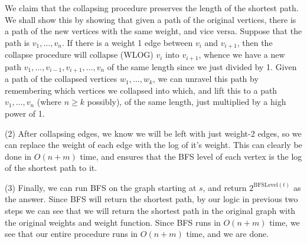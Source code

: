 \documentclass[12pt]{article}
\theoremstyle{definitionstyle}
\begin{document}
\begin{enumerate}[leftmargin=\labelsep]
        We claim that the collapsing procedure preserves the length of the shortest path. We shall show this by showing that given a path of the original vertices, there is a path of the new vertices with the same weight, and vice versa. Suppose that the path is $v_1, \ldots, v_n$. If there is a weight 1 edge between $v_i$ and $v_{i+1}$, then the collapse procedure will collapse (WLOG) $v_i$ into $v_{i+1}$, whence we have a new path $v_1, \ldots, v_{i-1}, v_{i+1}, \ldots, v_n$ of the same length since we just divided by 1. Given a path of the collapsed vertices $w_1, \ldots, w_k$, we can unravel this path by remembering which vertices we collapsed into which, and lift this to a path $v_1, \ldots, v_n$ (where $n \geq k$ possibly), of the same length, just multiplied by a high power of 1.

        (2) After collapsing edges, we know we will be left with just weight-2 edges, so we can replace the weight of each edge with the log of it's weight. This can clearly be done in $O(n+m)$ time, and ensures that the BFS level of each vertex is the log of the shortest path to it.

        (3) Finally, we can run BFS on the graph starting at $s$, and return $2^{\text{BFSLevel}(t)}$ as the answer. Since BFS will return the shortest path, by our logic in previous two steps we can see that we will return the shortest path in the original graph with the original weights and weight function. Since BFS runs in $O(n+m)$ time, we see that our entire procedure runs in $O(n+m)$ time, and we are done.


        
    \end{enumerate}
\end{document}
